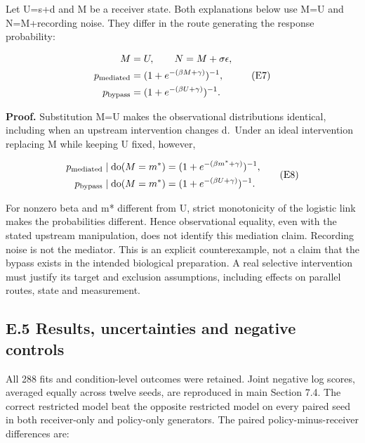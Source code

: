 \documentclass[
  american,
  11pt,
  letterpaper,
]{article}
\begin{document}
Let U=s+d and M be a receiver state. Both explanations below use M=U and N=M+recording noise. They differ in the route generating the response probability:

\[
\begin{aligned}
M&=U,\qquad N=M+\sigma\epsilon,\\
p_{\rm mediated}&=(1+e^{-(\beta M+\gamma)})^{-1},\\
p_{\rm bypass}&=(1+e^{-(\beta U+\gamma)})^{-1}.
\end{aligned}\tag{E7}
\]

\textbf{Proof.} Substitution M=U makes the observational distributions identical, including when an upstream intervention changes d.~Under an ideal intervention replacing M while keeping U fixed, however,

\[
\begin{aligned}
p_{\rm mediated}\mid\operatorname{do}(M=m^*)&=(1+e^{-(\beta m^*+\gamma)})^{-1},\\
p_{\rm bypass}\mid\operatorname{do}(M=m^*)&=(1+e^{-(\beta U+\gamma)})^{-1}.
\end{aligned}\tag{E8}
\]

For nonzero beta and m* different from U, strict monotonicity of the logistic link makes the probabilities different. Hence observational equality, even with the stated upstream manipulation, does not identify this mediation claim. Recording noise is not the mediator. This is an explicit counterexample, not a claim that the bypass exists in the intended biological preparation. A real selective intervention must justify its target and exclusion assumptions, including effects on parallel routes, state and measurement.

\subsection{E.5 Results, uncertainties and negative controls}\label{e.5-results-uncertainties-and-negative-controls}

All 288 fits and condition-level outcomes were retained. Joint negative log scores, averaged equally across twelve seeds, are reproduced in main Section 7.4. The correct restricted model beat the opposite restricted model on every paired seed in both receiver-only and policy-only generators. The paired policy-minus-receiver differences are:
\end{document}
